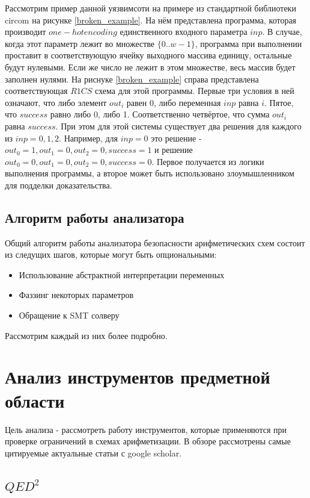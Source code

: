 \documentclass[a4paper]{article}
\begin{document}
Рассмотрим пример данной уязвимсоти на примере из стандартной библиотеки circom на рисунке \ref{broken_example}. На нём представлена программа, которая производит $one-hot encoding$ единственного входного параметра $inp$. В случае, когда этот параметр лежит во множестве $\{0..w-1\}$, программа при выполнении проставит в соответствующую ячейку выходного массива единицу, остальные будут нулевыми. Если же число не лежит в этом множестве, весь массив будет заполнен нулями. На риснуке \ref{broken_example} справа представлена соответствующая $R1CS$ схема для этой программы. Первые три условия в ней означают, что либо элемент $out_i$ равен 0, либо переменная $inp$ равна $i$. Пятое, что $success$ равно либо 0, либо 1. Соответственно четвёртое, что сумма $out_i$ равна $success$. При этом для этой системы существует два решения для каждого из $inp = 0, 1, 2$. Например, для $inp = 0$ это решение - $out_0 = 1, out_1 = 0, out_2 = 0, success = 1$ и решение $out_0 = 0, out_1 = 0, out_2 = 0, success = 0$. Первое получается из логики выполнения программы, а второе может быть использовано злоумышленником для подделки доказательства.

\subsection{Алгоритм работы анализатора}
Общий алгоритм работы анализатора безопасности арифметических схем состоит из следущих шагов, которые могут быть опциональными:
\begin{itemize}
    \item Использование абстрактной интерпретации переменных
    \item Фаззинг некоторых параметров
    \item Обращение к SMT солверу
\end{itemize}
Рассмотрим каждый из них более подробно.

\newpage
\section{Анализ инструментов предметной области}
\indent

Цель анализа - рассмотреть работу инструментов, которые применяются при проверке ограничений в схемах арифметизации. В обзоре рассмотрены самые цитируемые актуальные статьи с google scholar.

\subsection{$QED^2$}
\indent
\end{document}
